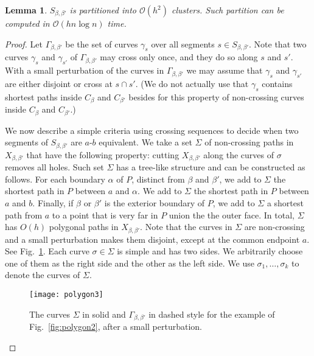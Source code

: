 \documentclass[11pt,a4paper]{article}
\newtheorem{lemma}[definition]{Lemma}
\begin{document}
\begin{lemma}\label{le:clusters1}
$S_{\beta,\beta'}$ is partitioned into ${\mathcal O}(h^2)$ clusters. Such partition can be computed in ${\mathcal O}(h n \log n)$ time.
\end{lemma}
\begin{proof}
Let $\Gamma_{\beta,\beta'}$ be the set of curves $\gamma_s$ over all segments $s\in S_{\beta,\beta'}$.
Note that two curves $\gamma_s$ and $\gamma_{s'}$ of $\Gamma_{\beta,\beta'}$ may cross only once, and they do so along $s$ and $s'$.
With a small perturbation of the curves in $\Gamma_{\beta,\beta'}$ we may assume that $\gamma_s$ and $\gamma_{s'}$ are either disjoint or cross at $s\cap s'$.
(We do not actually use that $\gamma_s$ contains shortest paths inside $C_\beta$ and $C_{\beta'}$ besides for this property of non-crossing curves inside $C_\beta$ and $C_{\beta'}$.)

We now describe a simple criteria using crossing sequences to decide when two segments of $S_{\beta,\beta'}$ are $a$-$b$ equivalent. We take a set $\Sigma$ of non-crossing paths in $X_{\beta,\beta'}$ that have the following property: cutting $X_{\beta,\beta'}$ along the curves of $\sigma$ removes all holes. Such set $\Sigma$ has a tree-like structure and can be constructed as follows. For each boundary $\alpha$ of $P$, distinct from $\beta$ and $\beta'$, we add to $\Sigma$ the shortest path in $P$ between $a$ and $\alpha$. We add to $\Sigma$ the shortest path in $P$ between $a$ and $b$. Finally, if $\beta$ or $\beta'$ is the exterior boundary of $P$, we add to $\Sigma$ a shortest path from $a$ to a point that is very far in $P$ union the the outer face. In total, $\Sigma$ has $O(h)$ polygonal paths in $X_{\beta,\beta'}$. Note that the curves in $\Sigma$ are non-crossing and a small perturbation makes them disjoint, except at the common endpoint $a$. See Fig.~\ref{fig:polygon3}. Each curve $\sigma\in \Sigma$ is simple and has two sides. We arbitrarily choose one of them as the right side and the other as the left side. We use $\sigma_1,\dots,\sigma_k$ to denote the curves of $\Sigma$.

\begin{figure}[t]
\centering
\texttt{[image: polygon3]}
\caption{The curves $\Sigma$ in solid and $\Gamma_{\beta,\beta'}$ in dashed style for the example of Fig.~\ref{fig:polygon2}, after a small perturbation.}
\label{fig:polygon3}
\end{figure}


\end{proof}
\end{document}
